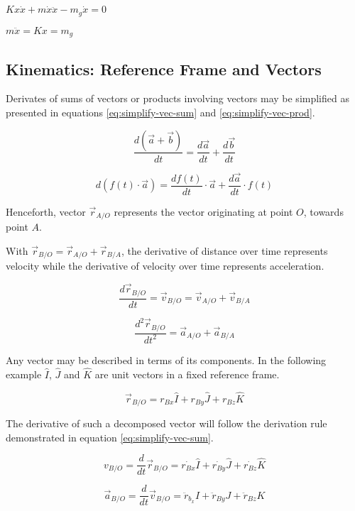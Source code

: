 $Kx\dot{x} + m\dot{x}\ddot{x} - m_g\dot{x} = 0$

$m\ddot{x} =  Kx = m_g$

\subsection{Kinematics: Reference Frame and Vectors}

Derivates of sums of vectors or products involving vectors may be simplified as
presented in equations \ref{eq:simplify-vec-sum} and
\ref{eq:simplify-vec-prod}.

\begin{equation}\label{eq:simplify-vec-sum}
  \frac{d(\vec{a} + \vec{b})}{dt} = \frac{d\vec{a}}{dt} + \frac{d \vec{b}}{dt}
\end{equation}

\begin{equation}\label{eq:simplify-vec-prod}
  d(f(t)\cdot\vec{a}) = \frac{d f(t)}{dt}\cdot\vec{a} + \frac{d\vec{a}}{dt}\cdot f(t)
\end{equation}

Henceforth, vector $\vec{r}_{A/O}$ represents the vector originating at point
$O$, towards point $A$.


With $\vec{r}_{B/O} = \vec{r}_{A/O} + \vec{r}_{B/A}$, the derivative of
distance over time represents velocity while the derivative of velocity over
time represents acceleration.

$$\frac{d\vec{r}_{B/O}}{dt} = \vec{v}_{B/O} = \vec{v}_{A/O} + \vec{v}_{B/A}$$

$$\frac{d^2 \vec{r}_{B/O}}{dt^2} = \vec{a}_{A/O} + \vec{a}_{B/A}$$


Any vector may be described in terms of its components. In the following
example $\hat I$, $\hat J$ and $\hat K$ are unit vectors in a fixed reference
frame.

$$\vec{r}_{B/O} = r_{Bx}\hat I + r_{By}\hat J + r_{Bz}\hat K$$

The derivative of such a decomposed vector will follow the derivation rule
demonstrated in equation \ref{eq:simplify-vec-sum}.

$$v_{B/O} = \frac{d}{dt}\vec{r}_{B/O} = \dot{r_{Bx}}\hat I +  \dot{r_{By}}\hat J +  \dot{r_{Bz}}\hat K$$


$$\vec{a}_{B/O} = \frac{d}{dt} \vec{v}_{B/O} = \ddot{r}_{b_x} I + \ddot{r}_{By} J + \ddot{r}_{Bz} K$$
